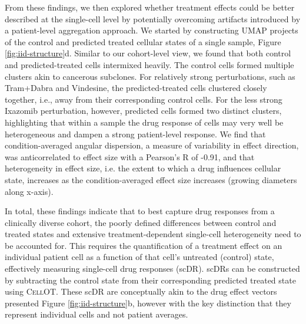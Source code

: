 From these findings, we then explored whether treatment effects could be better described at the single-cell level by potentially overcoming artifacts introduced by a patient-level aggregation approach.
We started by constructing UMAP projects of the control and predicted treated cellular states of a single sample, Figure \ref{fig:iid-structure}d.
Similar to our cohort-level view, we found that both control and predicted-treated cells intermixed heavily.
The control cells formed multiple clusters akin to cancerous subclones.
For relatively strong perturbations, such as Tram+Dabra and Vindesine, the predicted-treated cells clustered closely together, i.e., away from their corresponding control cells.
For the less strong Ixazomib perturbation, however, predicted cells formed two distinct clusters, highlighting that within a sample the drug response of cells may very well be heterogeneous and dampen a strong patient-level response.
We find that condition-averaged angular dispersion, a measure of variability in effect direction, was anticorrelated to effect size with a Pearson’s R of -0.91, and that heterogeneity in effect size, i.e. the extent to which a drug influences cellular state, increases as the condition-averaged effect size increases (growing diameters along x-axis). 

In total, these findings indicate that to best capture drug responses from a clinically diverse cohort, the poorly defined differences between control and treated states and extensive treatment-dependent single-cell heterogeneity need to be accounted for.
 This requires the quantification of a treatment effect on an individual patient cell as a function of that cell’s untreated (control) state, effectively measuring single-cell drug responses (scDR).
 scDRs can be constructed by subtracting the control state from their corresponding predicted treated state using \textsc{CellOT}.
These scDR are conceptually akin to the drug effect vectors presented Figure \ref{fig:iid-structure}b, however with the key distinction that they represent individual cells and not patient averages.

